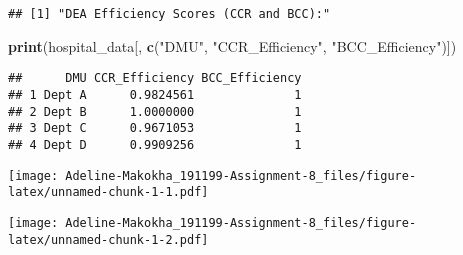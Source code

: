 \documentclass[
]{article}
\newenvironment{Shaded}{\begin{snugshade}}{\end{snugshade}}
\newcommand{\AttributeTok}[1]{\textcolor[rgb]{0.13,0.29,0.53}{#1}}
\newcommand{\CommentTok}[1]{\textcolor[rgb]{0.56,0.35,0.01}{\textit{#1}}}
\newcommand{\DecValTok}[1]{\textcolor[rgb]{0.00,0.00,0.81}{#1}}
\newcommand{\FloatTok}[1]{\textcolor[rgb]{0.00,0.00,0.81}{#1}}
\newcommand{\FunctionTok}[1]{\textcolor[rgb]{0.13,0.29,0.53}{\textbf{#1}}}
\newcommand{\NormalTok}[1]{#1}
\newcommand{\SpecialCharTok}[1]{\textcolor[rgb]{0.81,0.36,0.00}{\textbf{#1}}}
\newcommand{\StringTok}[1]{\textcolor[rgb]{0.31,0.60,0.02}{#1}}
\begin{document}
\begin{verbatim}
## [1] "DEA Efficiency Scores (CCR and BCC):"
\end{verbatim}

\begin{Shaded}
\begin{Highlighting}[]
\FunctionTok{print}\NormalTok{(hospital\_data[, }\FunctionTok{c}\NormalTok{(}\StringTok{"DMU"}\NormalTok{, }\StringTok{"CCR\_Efficiency"}\NormalTok{, }\StringTok{"BCC\_Efficiency"}\NormalTok{)])}
\end{Highlighting}
\end{Shaded}

\begin{verbatim}
##      DMU CCR_Efficiency BCC_Efficiency
## 1 Dept A      0.9824561              1
## 2 Dept B      1.0000000              1
## 3 Dept C      0.9671053              1
## 4 Dept D      0.9909256              1
\end{verbatim}

\begin{Shaded}
\end{Shaded}

\texttt{[image: Adeline-Makokha\_191199-Assignment-8\_files/figure-latex/unnamed-chunk-1-1.pdf]}

\begin{Shaded}
\end{Shaded}

\texttt{[image: Adeline-Makokha\_191199-Assignment-8\_files/figure-latex/unnamed-chunk-1-2.pdf]}
\end{document}
